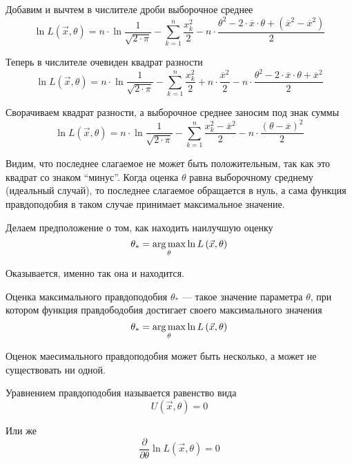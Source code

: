 \begin{example}
    Добавим и вычтем в числителе дроби выборочное среднее
    $$\ln{L\left( \vec{x},\theta \right)}
        =n\cdot\ln{\frac{1}{\sqrt{2\cdot\pi}}}
            -\sum_{k=1}^n \frac{x_k^2}{2}
            -n\cdot\frac{\theta^2
                -2\cdot\overline{x}\cdot\theta
                +\left(\overline{x}^2-\overline{x}^2\right)}{2}$$

    Теперь в числителе очевиден квадрат разности
    $$\ln{L\left( \vec{x},\theta \right)}
        =n\cdot\ln{\frac{1}{\sqrt{2\cdot\pi}}}
            -\sum_{k=1}^n \frac{x_k^2}{2}
            +n\cdot\frac{\overline{x}^2}{2}
            -n\cdot\frac{\theta^2
                -2\cdot\overline{x}\cdot\theta
                +\overline{x}^2}{2}$$

    Сворачиваем квадрат разности,
    а выборочное среднее заносим под знак суммы
    $$\ln{L\left( \vec{x},\theta \right)}
        =n\cdot\ln{\frac{1}{\sqrt{2\cdot\pi}}}
            -\sum_{k=1}^n \frac{x_k^2-\overline{x}^2}{2}
            -n\cdot\frac{\left(\theta-\overline{x}\right)^2}{2}$$

    Видим, что последнее слагаемое не может быть положительным,
    так как это квадрат со знаком ``минус''.
    Когда оценка $\theta$ равна выборочному среднему (идеальный случай),
    то последнее слагаемое обращается в нуль, а сама функция правдоподобия
    в таком случае принимает максимальное значение.

    Делаем предположение о том, как находить наилучшую оценку
    $$\theta_*=\underset{\theta}{\operatorname{arg\,max}}\ln{L\left( \vec{x},\theta \right)}$$

    Оказывается, именно так она и находится.
\end{example}

\begin{definition}
    \label{def:maximumLikelihoodEstimation}
    Оценка максимального правдоподобия
    $\theta_*$ --- такое значение параметра $\theta$,
    при котором функция правдободобия достигает своего максимального значения
    $$\theta_*=\underset{\theta}{\operatorname{arg\,max}}\ln{L\left( \vec{x},\theta \right)}$$
\end{definition}

\begin{remark}
    Оценок маесимального правдоподобия может быть несколько,
    а может не существовать ни одной.
\end{remark}

\begin{definition}
    Уравнением правдоподобия называется равенство вида
    $$U\left( \vec{x},\theta \right)=0$$

    Или же
    $$\frac{\partial}{\partial\theta}\ln{L\left( \vec{x},\theta \right)}=0$$
\end{definition}

